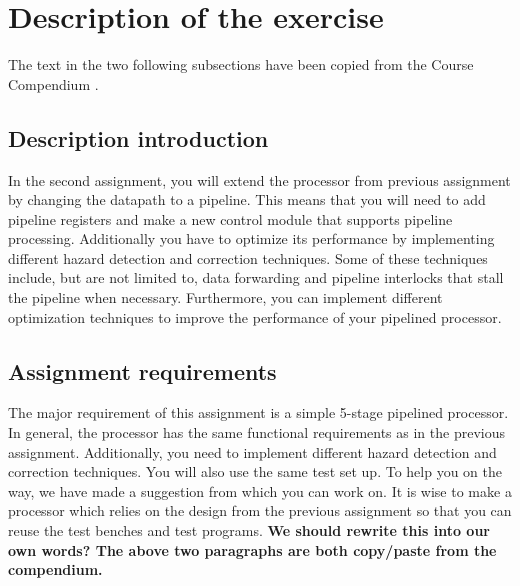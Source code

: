 \section{Description of the exercise}

The text in the two following subsections have been copied from the Course
Compendium \cite{compendium}.

\subsection{Description introduction}

In the second assignment, you will extend the processor from previous
assignment by changing the datapath to a pipeline. This means that you will need
to add pipeline registers and make a new control module that supports pipeline
processing. Additionally you have to optimize its performance by implementing
diﬀerent hazard detection and correction techniques. Some of these techniques
include, but are not limited to, data forwarding and pipeline interlocks that
stall the pipeline when necessary. Furthermore, you can implement different
optimization techniques to improve the performance of your pipelined processor.

\subsection{Assignment requirements}

The major requirement of this assignment is a simple 5-stage pipelined
processor. In general, the processor has the same functional requirements as in
the previous assignment. Additionally, you need to implement diﬀerent hazard
detection and correction techniques. You will also use the same test set up. To
help you on the way, we have made a suggestion from which you can work on. It is
wise to make a processor which relies on the design from the previous assignment
so that you can reuse the test benches and test programs.
\newline\newline
\textbf{We should rewrite this into our own words? The above two paragraphs are
both copy/paste from the compendium.}
